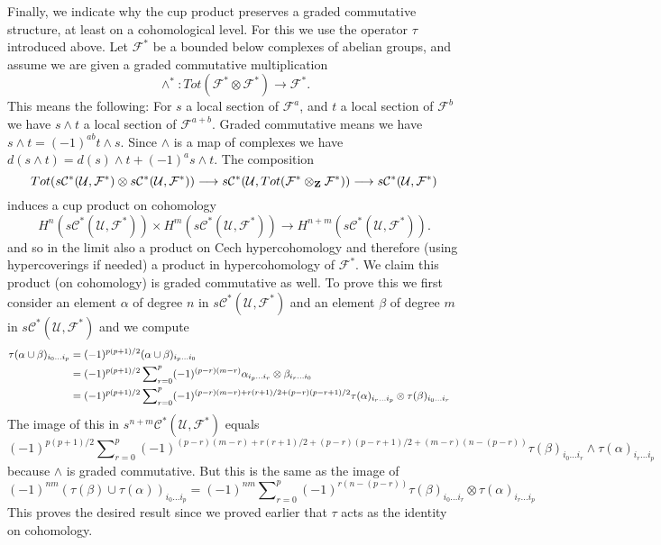 \medskip\noindent
Finally, we indicate why the cup product preserves
a graded commutative structure, at least on a cohomological level.
For this we use the operator
$\tau$ introduced above. Let ${\mathcal F}^*$ be a bounded below
complexes of abelian groups, and assume we are given
a graded commutative multiplication
$$
\wedge^* : Tot({\mathcal F}^*\otimes {\mathcal F}^*) \to {\mathcal F}^*.
$$
This means the following: For $s$ a local section of
${\mathcal F}^a$, and $t$ a local section of ${\mathcal F}^b$
we have $s \wedge t$ a local section of ${\mathcal F}^{a+b}$.
Graded commutative means we have
$s \wedge t = (-1)^{ab} t \wedge s$. Since $\wedge$ is a map
of complexes we have
$d(s\wedge t) = d(s) \wedge t + (-1)^a s \wedge t$.
The composition
$$
Tot(
s{\mathcal C}^*({\mathcal U},{\mathcal F}^*)
\otimes
s{\mathcal C}^*({\mathcal U},{\mathcal F}^*)
) \longrightarrow
s{\mathcal C}^*({\mathcal U},Tot({\mathcal F}^*\otimes_{\bf Z}{\mathcal F}^*))
\longrightarrow
s{\mathcal C}^*({\mathcal U},{\mathcal F}^*)
$$
induces a cup product on cohomology
$$
H^n(s{\mathcal C}^*({\mathcal U},{\mathcal F}^*))
\times 
H^m(s{\mathcal C}^*({\mathcal U},{\mathcal F}^*))
\longrightarrow
H^{n+m}(s{\mathcal C}^*({\mathcal U},{\mathcal F}^*)).
$$
and so in the limit also a product on Cech hypercohomology
and therefore (using hypercoverings if needed) a product 
in hypercohomology of ${\mathcal F}^*$. We claim this product
(on cohomology) is graded commutative as well. To prove this
we first consider an element $\alpha$ of degree $n$ in
$s{\mathcal C}^*({\mathcal U}, {\mathcal F}^*)$ and an element
$\beta$ of degree $m$ in $s{\mathcal C}^*({\mathcal U}, {\mathcal F}^*)$
and we compute
\begin{align}
\tau( \alpha \cup \beta )_{i_0\ldots i_p}
& =
(-1)^{p(p+1)/2}
(\alpha \cup \beta)_{i_p\ldots i_0}
\cr
& =
(-1)^{p(p+1)/2}
\sum\nolimits_{r=0}^p
(-1)^{(p-r)(m-r)}
\alpha_{i_p\ldots i_r}\otimes \beta_{i_r\ldots i_0}
\cr
& = 
(-1)^{p(p+1)/2}
\sum\nolimits_{r=0}^p
(-1)^{(p-r)(m-r) + r(r+1)/2 + (p-r)(p-r+1)/2}
\tau(\alpha)_{i_r\ldots i_p}\otimes \tau(\beta)_{i_0\ldots i_r}
\end{align}
The image of this in $s^{n+m}{\mathcal C}^*({\mathcal U},{\mathcal F}^*)$
equals
$$
(-1)^{p(p+1)/2}
\sum\nolimits_{r=0}^p
(-1)^{(p-r)(m-r) + r(r+1)/2 + (p-r)(p-r+1)/2 + (m-r)(n-(p-r))}
\tau(\beta)_{i_0\ldots i_r} \wedge \tau(\alpha)_{i_r\ldots i_p}
$$
because $\wedge$ is graded commutative. But this is the same
as the image of 
$$
(-1)^{nm}
(\tau(\beta) \cup \tau(\alpha))_{i_0\ldots i_p}
=
(-1)^{nm}
\sum\nolimits_{r=0}^p
(-1)^{r(n-(p-r))}
\tau(\beta)_{i_0\ldots i_r} \otimes \tau(\alpha)_{i_r\ldots i_p}
$$
This proves the desired result since we proved earlier that
$\tau$ acts as the identity on cohomology.



